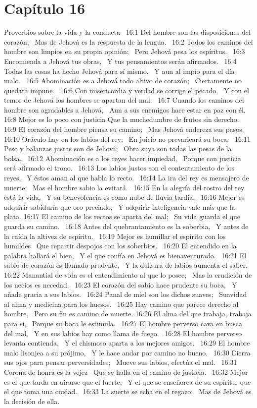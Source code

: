 \section*{Capítulo 16 }
Proverbios sobre la vida y la conducta  
16:1 Del hombre son las disposiciones del corazón;  
Mas de Jehová es la respuesta de la lengua.  
16:2 Todos los caminos del hombre son limpios en su propia opinión;  
Pero Jehová pesa los espíritus.  
16:3 Encomienda a Jehová tus obras,  
Y tus pensamientos serán afirmados.  
16:4 Todas las cosas ha hecho Jehová para sí mismo,  
Y aun al impío para el día malo.  
16:5 Abominación es a Jehová todo altivo de corazón;  
Ciertamente no quedará impune.  
16:6 Con misericordia y verdad se corrige el pecado,  
Y con el temor de Jehová los hombres se apartan del mal.  
16:7 Cuando los caminos del hombre son agradables a Jehová,  
Aun a sus enemigos hace estar en paz con él.  
16:8 Mejor es lo poco con justicia 
Que la muchedumbre de frutos sin derecho.  
16:9 El corazón del hombre piensa su camino;  
Mas Jehová endereza sus pasos.  
16:10 Oráculo hay en los labios del rey;  
En juicio no prevaricará su boca.  
16:11 Peso y balanzas justas son de Jehová;  
Obra suya son todas las pesas de la bolsa.  
16:12 Abominación es a los reyes hacer impiedad,  
Porque con justicia será afirmado el trono.  
16:13 Los labios justos son el contentamiento de los reyes,  
Y éstos aman al que habla lo recto.  
16:14 La ira del rey es mensajero de muerte;  
Mas el hombre sabio la evitará.  
16:15 En la alegría del rostro del rey está la vida,  
Y su benevolencia es como nube de lluvia tardía.  
16:16 Mejor es adquirir sabiduría que oro preciado;  
Y adquirir inteligencia vale más que la plata. 
16:17 El camino de los rectos se aparta del mal;  
Su vida guarda el que guarda su camino.  
16:18 Antes del quebrantamiento es la soberbia,  
Y antes de la caída la altivez de espíritu.  
16:19 Mejor es humillar el espíritu con los humildes  
Que repartir despojos con los soberbios.  
16:20 El entendido en la palabra hallará el bien,  
Y el que confía en Jehová es bienaventurado.  
16:21 El sabio de corazón es llamado prudente,  
Y la dulzura de labios aumenta el saber.  
16:22 Manantial de vida es el entendimiento al que lo posee;  
Mas la erudición de los necios es necedad.  
16:23 El corazón del sabio hace prudente su boca,  
Y añade gracia a sus labios.  
16:24 Panal de miel son los dichos suaves;  
Suavidad al alma y medicina para los huesos.  
16:25 Hay camino que parece derecho al hombre,  
Pero su fin es camino de muerte. 
16:26 El alma del que trabaja, trabaja para sí,  
Porque su boca le estimula.  
16:27 El hombre perverso cava en busca del mal,  
Y en sus labios hay como llama de fuego.  
16:28 El hombre perverso levanta contienda,  
Y el chismoso aparta a los mejores amigos.  
16:29 El hombre malo lisonjea a su prójimo,  
Y le hace andar por camino no bueno.  
16:30 Cierra sus ojos para pensar perversidades;  
Mueve sus labios, efectúa el mal.  
16:31 Corona de honra es la vejez  
Que se halla en el camino de justicia.  
16:32 Mejor es el que tarda en airarse que el fuerte;  
Y el que se enseñorea de su espíritu, que el que toma una ciudad.  
16:33 La suerte se echa en el regazo;  
Mas de Jehová es la decisión de ella.  

